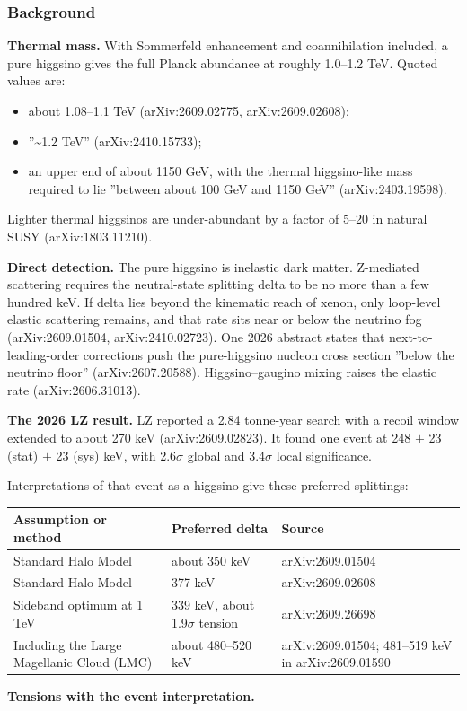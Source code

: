 \documentclass[11pt,a4paper]{article}
\begin{document}
\subsubsection*{Background}
\textbf{Thermal mass.} With Sommerfeld enhancement and coannihilation included, a pure higgsino gives the full Planck abundance at roughly 1.0--1.2 TeV. Quoted values are:

\begin{itemize}
  \item about 1.08--1.1 TeV (arXiv:2609.02775, arXiv:2609.02608);
  \item ''\textasciitilde{}1.2 TeV'' (arXiv:2410.15733);
  \item an upper end of about 1150 GeV, with the thermal higgsino-like mass required to lie ''between about 100 GeV and 1150 GeV'' (arXiv:2403.19598).
\end{itemize}
Lighter thermal higgsinos are under-abundant by a factor of 5--20 in natural SUSY (arXiv:1803.11210).

\textbf{Direct detection.} The pure higgsino is inelastic dark matter. Z-mediated scattering requires the neutral-state splitting delta to be no more than a few hundred keV. If delta lies beyond the kinematic reach of xenon, only loop-level elastic scattering remains, and that rate sits near or below the neutrino fog (arXiv:2609.01504, arXiv:2410.02723). One 2026 abstract states that next-to-leading-order corrections push the pure-higgsino nucleon cross section ''below the neutrino floor'' (arXiv:2607.20588). Higgsino--gaugino mixing raises the elastic rate (arXiv:2606.31013).

\textbf{The 2026 LZ result.} LZ reported a 2.84 tonne-year search with a recoil window extended to about 270 keV (arXiv:2609.02823). It found one event at 248 $\pm$ 23 (stat) $\pm$ 23 (sys) keV, with 2.6$\sigma$ global and 3.4$\sigma$ local significance.

Interpretations of that event as a higgsino give these preferred splittings:

\begin{longtable}{@{}p{}p{}p{}@{}}
\toprule
\textbf{Assumption or method} & \textbf{Preferred delta} & \textbf{Source} \\ \midrule \endhead
Standard Halo Model & about 350 keV & arXiv:2609.01504 \\
Standard Halo Model & 377 keV & arXiv:2609.02608 \\
Sideband optimum at 1 TeV & 339 keV, about 1.9$\sigma$ tension & arXiv:2609.26698 \\
Including the Large Magellanic Cloud (LMC) & about 480--520 keV & arXiv:2609.01504; 481--519 keV in arXiv:2609.01590 \\
\bottomrule\end{longtable}
\textbf{Tensions with the event interpretation.}
\end{document}

